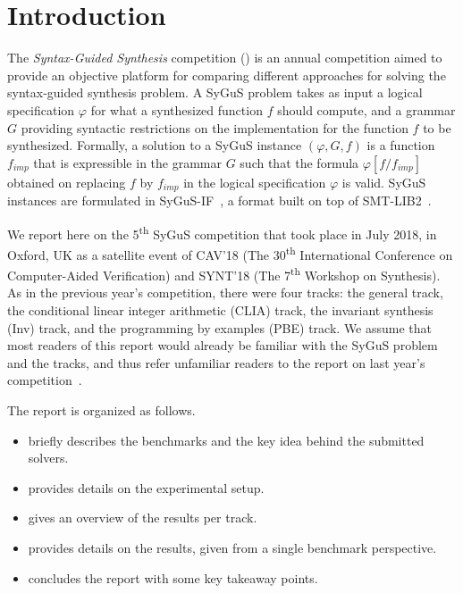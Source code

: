 \section{Introduction}
\label{sec:intro}

The \emph{Syntax-Guided Synthesis} competition (\comp) is an annual competition aimed to provide
an objective platform for comparing different approaches for solving the syntax-guided synthesis problem.
A SyGuS problem takes as input a logical specification $\varphi$ for what a synthesized function $f$ should compute,
and a grammar $G$ providing syntactic restrictions on the implementation for the function $f$ to be synthesized.
Formally, a solution to a SyGuS instance $(\varphi,G,f)$ is a function $f_{imp}$ that is expressible in the grammar $G$
such that the formula $\varphi[f/f_{imp}]$ obtained on replacing $f$ by $f_{imp}$ in the logical specification $\varphi$ is valid.
SyGuS instances are formulated in SyGuS-IF~\cite{RaghothamanU14}, a format built on top of SMT-LIB2~\cite{smtlib}.

We report here on the 5\textsuperscript{th} SyGuS competition that took place in July 2018,
in Oxford, UK as a satellite event of CAV'18 (The 30\textsuperscript{th} International Conference on Computer-Aided Verification)
and SYNT'18 (The 7\textsuperscript{th} Workshop on Synthesis).
As in the previous year's competition, there were four tracks:
the general track, the conditional linear integer arithmetic (CLIA) track, the invariant synthesis (Inv) track,
and the programming by examples (PBE) track.
We assume that most readers of this report would already be familiar with the SyGuS problem and the \comp{} tracks,
and thus refer unfamiliar readers to the report on last year's competition~\cite{SyGuSComp17}.

The report is organized as follows.
\begin{itemize}[topsep=0.25em]
    \item {} briefly describes the benchmarks and the key idea behind the submitted solvers.
    \item {} provides details on the experimental setup.
    \item {} gives an overview of the results per track.
    \item {} provides details on the results, given from a single benchmark perspective.
    \item {} concludes the report with some key takeaway points.
\end{itemize}
 